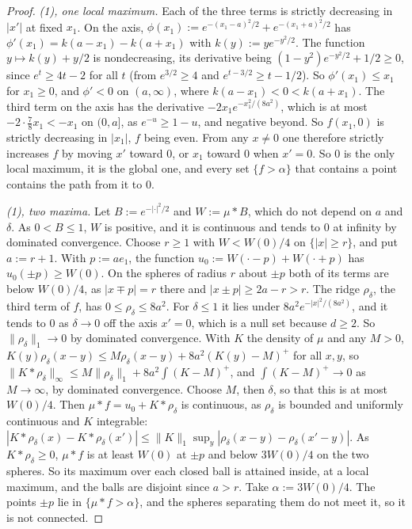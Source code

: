 \begin{proof}
\emph{(1), one local maximum.} Each of the three terms is strictly decreasing in $|x'|$ at fixed
$x_1$. On the axis, $\phi(x_1) := e^{-(x_1 - a)^2/2} + e^{-(x_1 + a)^2/2}$ has
$\phi'(x_1) = k(a - x_1) - k(a + x_1)$ with $k(y) := ye^{-y^2/2}$. The function $y \mapsto k(y) + y/2$
is nondecreasing, its derivative being $(1 - y^2)e^{-y^2/2} + 1/2 \ge 0$, since
$e^t \ge 4t - 2$ for all $t$ (from $e^{3/2} \ge 4$ and $e^{t - 3/2} \ge t - 1/2$). So
$\phi'(x_1) \le x_1$ for $x_1 \ge 0$, and $\phi' < 0$ on $(a, \infty)$, where $k(a - x_1) < 0 <
k(a + x_1)$. The third term on the axis has the derivative $-2x_1e^{-x_1^2/(8a^2)}$, which is at
most $-2 \cdot \frac{7}{8}x_1 < -x_1$ on $(0, a]$, as $e^{-u} \ge 1 - u$, and negative beyond. So $f(x_1, 0)$ is strictly decreasing in $|x_1|$, $f$ being even. From any
$x \ne 0$ one therefore strictly increases $f$ by moving $x'$ toward $0$, or $x_1$ toward $0$ when
$x' = 0$. So $0$ is the only local maximum, it is the global one, and every set $\{f > \alpha\}$ that
contains a point contains the path from it to $0$.

\emph{(1), two maxima.} Let
$B := e^{-|\cdot|^2/2}$ and $W := \mu * B$, which do not depend on $a$
and $\delta$. As $0 < B \le 1$, $W$ is positive, and it is continuous and tends to $0$ at infinity
by dominated convergence. Choose $r \ge 1$ with $W < W(0)/4$ on $\{|x| \ge r\}$, and put
$a := r + 1$. With $p := ae_1$, the function $u_0 := W(\cdot - p) + W(\cdot + p)$ has
$u_0(\pm p) \ge W(0)$. On the spheres of radius $r$ about $\pm p$ both of its terms are below
$W(0)/4$, as $|x \mp p| = r$ there and $|x \pm p| \ge 2a - r > r$. The
ridge $\rho_\delta$, the third term of $f$, has $0 \le \rho_\delta \le 8a^2$. For $\delta \le 1$ it
lies under $8a^2e^{-|x|^2/(8a^2)}$, and it tends to $0$ as $\delta \to 0$ off the axis $x' = 0$,
which is a null set because $d \ge 2$. So $\|\rho_\delta\|_1 \to 0$ by dominated convergence. With
$K$ the density of $\mu$ and any $M > 0$, $K(y)\rho_\delta(x - y) \le M\rho_\delta(x - y) + 8a^2(K(y) - M)^+$ for all $x, y$, so $\|K * \rho_\delta\|_\infty \le M\|\rho_\delta\|_1 + 8a^2\int(K - M)^+$, and
$\int(K - M)^+ \to 0$ as $M \to \infty$, by dominated convergence. Choose $M$, then $\delta$, so
that this is at most $W(0)/4$. Then $\mu * f = u_0 + K * \rho_\delta$ is continuous, as $\rho_\delta$ is
bounded and uniformly continuous and $K$ integrable:
$|K * \rho_\delta(x) - K * \rho_\delta(x')| \le \|K\|_1\sup_y|\rho_\delta(x - y) - \rho_\delta(x' - y)|$.
As $K * \rho_\delta \ge 0$, $\mu * f$ is at least $W(0)$ at $\pm p$ and below $3W(0)/4$ on the
two spheres. So its maximum over each closed ball is attained inside, at a local maximum, and the
balls are disjoint since $a > r$. Take $\alpha := 3W(0)/4$. The points $\pm p$ lie in
$\{\mu * f > \alpha\}$, and the spheres separating them do not meet it, so it is not connected.


\end{proof}
